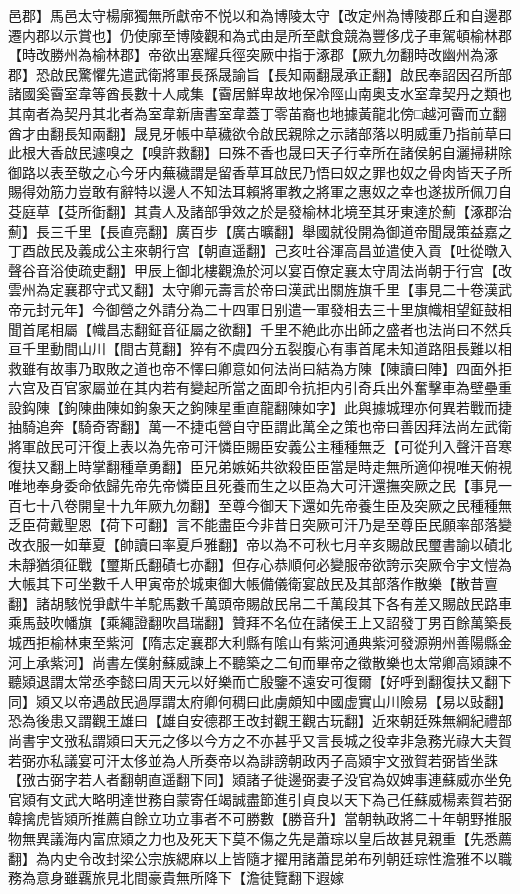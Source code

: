 邑郡】馬邑太守楊廓獨無所獻帝不悦以和為博陵太守【改定州為博陵郡丘和自邊郡遷内郡以示賞也】仍使廓至博陵觀和為式由是所至獻食競為豐侈戊子車駕頓榆林郡【時改勝州為榆林郡】帝欲出塞耀兵徑突厥中指于涿郡【厥九勿翻時改幽州為涿郡】恐啟民驚懼先遣武衛將軍長孫晟諭旨【長知兩翻晟承正翻】啟民奉詔因召所部諸國奚霫室韋等酋長數十人咸集【霫居鮮卑故地保冷陘山南奥支水室韋契丹之類也其南者為契丹其北者為室韋新唐書室韋蓋丁零苖裔也地據黃龍北傍□越河霫而立翻酋才由翻長知兩翻】晟見牙帳中草穢欲令啟民親除之示諸部落以明威重乃指前草曰此根大香啟民遽嗅之【嗅許救翻】曰殊不香也晟曰天子行幸所在諸侯躬自灑掃耕除御路以表至敬之心今牙内蕪穢謂是留香草耳啟民乃悟曰奴之罪也奴之骨肉皆天子所賜得効筋力豈敢有辭特以邊人不知法耳賴將軍教之將軍之惠奴之幸也遂拔所佩刀自芟庭草【芟所衘翻】其貴人及諸部爭效之於是發榆林北境至其牙東達於薊【涿郡治薊】長三千里【長直亮翻】廣百步【廣古曠翻】舉國就役開為御道帝聞晟策益嘉之丁酉啟民及義成公主來朝行宫【朝直遥翻】己亥吐谷渾高昌並遣使入貢【吐從暾入聲谷音浴使疏吏翻】甲辰上御北樓觀漁於河以宴百僚定襄太守周法尚朝于行宫【改雲州為定襄郡守式又翻】太守卿元壽言於帝曰漢武出關旌旗千里【事見二十卷漢武帝元封元年】今御營之外請分為二十四軍日别遣一軍發相去三十里旗幟相望鉦鼓相聞首尾相屬【幟昌志翻鉦音征屬之欲翻】千里不絶此亦出師之盛者也法尚曰不然兵亘千里動間山川【間古莧翻】猝有不虞四分五裂腹心有事首尾未知道路阻長難以相救雖有故事乃取敗之道也帝不懌曰卿意如何法尚曰結為方陳【陳讀曰陣】四面外拒六宫及百官家屬並在其内若有變起所當之面即令抗拒内引奇兵出外奮擊車為壁壘重設鈎陳【鉤陳曲陳如鉤象天之鉤陳星重直龍翻陳如字】此與據城理亦何異若戰而捷抽騎追奔【騎奇寄翻】萬一不捷屯營自守臣謂此萬全之策也帝曰善因拜法尚左武衛將軍啟民可汗復上表以為先帝可汗憐臣賜臣安義公主種種無乏【可從刋入聲汗音寒復扶又翻上時掌翻種章勇翻】臣兄弟嫉妬共欲殺臣臣當是時走無所適仰視唯天俯視唯地奉身委命依歸先帝先帝憐臣且死養而生之以臣為大可汗還撫突厥之民【事見一百七十八卷開皇十九年厥九勿翻】至尊今御天下還如先帝養生臣及突厥之民種種無乏臣荷戴聖恩【荷下可翻】言不能盡臣今非昔日突厥可汗乃是至尊臣民願率部落變改衣服一如華夏【帥讀曰率夏戶雅翻】帝以為不可秋七月辛亥賜啟民璽書諭以磧北未靜猶須征戰【璽斯氏翻磧七亦翻】但存心恭順何必變服帝欲誇示突厥令宇文愷為大帳其下可坐數千人甲寅帝於城東御大帳備儀衛宴啟民及其部落作散樂【散昔亶翻】諸胡駭悦爭獻牛羊駝馬數千萬頭帝賜啟民帛二千萬段其下各有差又賜啟民路車乘馬鼓吹幡旗【乘繩證翻吹昌瑞翻】贊拜不名位在諸侯王上又詔發丁男百餘萬築長城西拒榆林東至紫河【隋志定襄郡大利縣有隂山有紫河通典紫河發源朔州善陽縣金河上承紫河】尚書左僕射蘇威諫上不聽築之二旬而畢帝之徵散樂也太常卿高熲諫不聽熲退謂太常丞李懿曰周天元以好樂而亡殷鑒不遠安可復爾【好呼到翻復扶又翻下同】熲又以帝遇啟民過厚謂太府卿何稠曰此虜頗知中國虚實山川險易【易以䜴翻】恐為後患又謂觀王雄曰【雄自安德郡王改封觀王觀古玩翻】近來朝廷殊無綱紀禮部尚書宇文㢸私謂熲曰天元之侈以今方之不亦甚乎又言長城之役幸非急務光祿大夫賀若弼亦私議宴可汗太侈並為人所奏帝以為誹謗朝政丙子高熲宇文㢸賀若弼皆坐誅【㢸古弼字若人者翻朝直遥翻下同】熲諸子徙邊弼妻子没官為奴婢事連蘇威亦坐免官熲有文武大略明達世務自蒙寄任竭誠盡節進引貞良以天下為己任蘇威楊素賀若弼韓擒虎皆熲所推薦自餘立功立事者不可勝數【勝音升】當朝執政將二十年朝野推服物無異議海内富庶熲之力也及死天下莫不傷之先是蕭琮以皇后故甚見親重【先悉薦翻】為内史令改封梁公宗族緦麻以上皆隨才擢用諸蕭昆弟布列朝廷琮性澹雅不以職務為意身雖覊旅見北間豪貴無所降下【澹徒覽翻下遐嫁